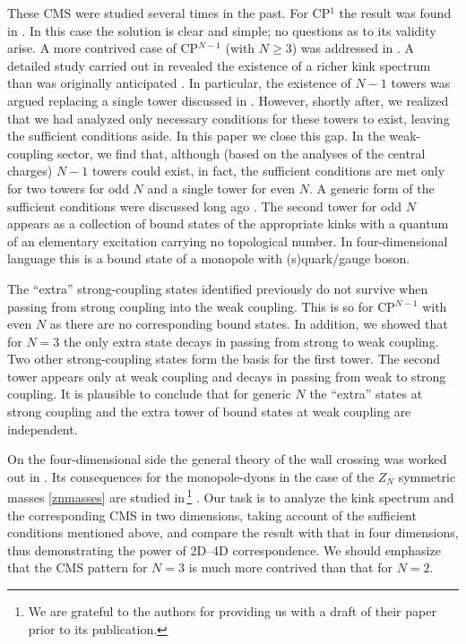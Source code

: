 \documentclass[epsfig,12pt]{article}
\begin{document}
	These CMS were studied several times in the past. For CP$^1$ the result was found in \cite{SVZw}.
	In this case the solution is clear and simple; no questions as to its validity arise.
	A more contrived case of 
	CP$^{N-1}$ (with $N\geq 3$) was addressed in \cite{5,Bolokhov:2011mp}. 
	A detailed study carried out in \cite{Bolokhov:2011mp} revealed
	the existence of a richer kink spectrum than was originally anticipated \cite{Dorey:1998yh}. 
	In particular, the existence of $ N-1 $ towers was argued replacing  a single tower discussed in \cite{Dorey:1998yh}. 
	However, shortly after, we realized
	that we had analyzed only necessary conditions for these towers to exist, leaving the sufficient conditions aside.
	In this paper we close this gap. 
	In the weak-coupling sector, we find that, although (based on the analyses of the central charges) $ N-1 $ towers could exist, 
	in fact, the sufficient conditions are met only for two towers for odd $N$ and a single tower for even $N$. 
	A generic form of the sufficient conditions were discussed long ago \cite{Dorey:1999zk}.
	The second tower for odd $N$ appears as a collection of bound states of the appropriate kinks with a quantum of
	an elementary excitation carrying no topological number.  In four-dimensional language this is a bound state of a monopole with (s)quark/gauge boson.

	The ``extra'' strong-coupling states identified previously do not survive when passing from strong coupling
	into the weak coupling.
	This is so for CP$^{N-1}$ with even $ N $ as there are no corresponding bound states.
	In addition, we showed that for $ N = 3 $ the only extra state decays in passing from strong 
	to weak coupling. 
	Two other strong-coupling states form the basis for the first tower. 
	The second tower appears only at weak coupling and decays in passing from weak to strong coupling.
	It is plausible to conclude that for generic $ N $ the ``extra'' states at strong coupling
	and the extra tower of bound states at weak coupling are independent.

	On the four-dimensional side the general theory of the wall crossing was worked out in \cite{koso}. 
	Its consequences for the monopole-dyons in the case of the $Z_N$ symmetric masses \eqref{znmasses}
	are studied in\,\footnote{We are grateful to the authors for providing us with a draft of their paper prior to its publication.}
	\cite{ndkp}. 
	Our task is to analyze the kink spectrum and the corresponding CMS in two dimensions, 
	taking account of the sufficient conditions mentioned above, 
	and compare the result with that in four dimensions, 
	thus  demonstrating the power of 2D--4D correspondence. We should emphasize that the
	CMS pattern for $N=3$ is much more contrived than that for $N=2$.
	
\end{document}

